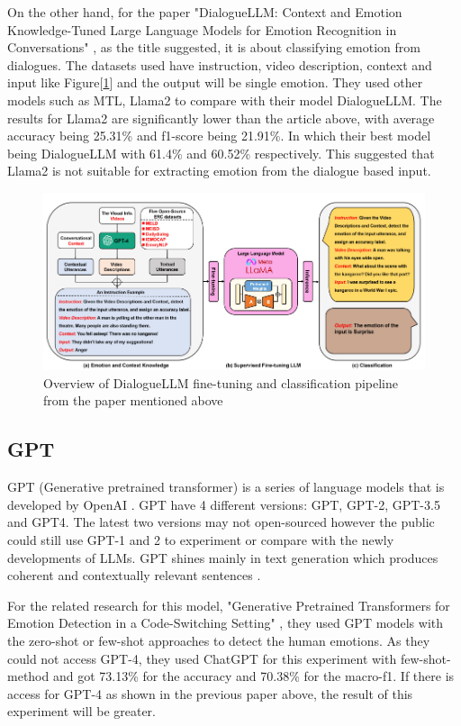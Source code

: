 On the other hand, for the paper "DialogueLLM: Context and Emotion Knowledge-Tuned Large Language Models for Emotion Recognition in Conversations" \cite{zhang2024dialoguellm}, as the title suggested, it is about classifying emotion from dialogues. The datasets used have instruction, video description, context and input like Figure[\ref{fig:DialogueLLM}] and the output will be single emotion. They used other models such as MTL, Llama2 to compare with their model DialogueLLM. The results for Llama2 are significantly lower than the article above, with average accuracy being 25.31\% and f1-score being 21.91\%. In which their best model being DialogueLLM with 61.4\% and 60.52\% respectively. This suggested that Llama2 is not suitable for extracting emotion from the dialogue based input. 
\begin{figure}[!htb]
    \centerline{\includegraphics[scale=.68]{Figures/dialogueLLM.png}}
    \caption{Overview of DialogueLLM fine-tuning and classification pipeline from the paper mentioned above}
    \label{fig:DialogueLLM}
 \end{figure}

\subsection{GPT}
 GPT (Generative pretrained transformer) is a series of language models that is developed by OpenAI \cite{Jorge_2023}. GPT have 4 different versions: GPT, GPT-2, GPT-3.5 and GPT4. The latest two versions may not open-sourced however the public could still use GPT-1 and 2 to experiment or compare with the newly developments of LLMs. GPT shines mainly in text generation which produces coherent and contextually relevant sentences \cite{Jorge_2023}.
 
 For the related research for this model, "Generative Pretrained Transformers for Emotion Detection in a Code-Switching Setting" \cite{Nedilko}, they used GPT models with the zero-shot or few-shot approaches to detect the human emotions. As they could not access GPT-4, they used ChatGPT for this experiment with few-shot-method and got 73.13\% for the accuracy and 70.38\% for the macro-f1. If there is access for GPT-4 as shown in the previous paper above, the result of this experiment will be greater.
 
